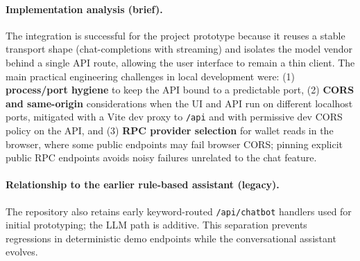 \documentclass[12pt,a4paper]{report}
\begin{document}
\paragraph{Implementation analysis (brief).}
The integration is successful for the project prototype because it reuses a stable transport shape (chat-completions with streaming) and isolates the model vendor behind a single API route, allowing the user interface to remain a thin client. The main practical engineering challenges in local development were: (1) \textbf{process/port hygiene} to keep the API bound to a predictable port, (2) \textbf{CORS and same-origin} considerations when the UI and API run on different localhost ports, mitigated with a Vite dev proxy to \texttt{/api} and with permissive dev CORS policy on the API, and (3) \textbf{RPC provider selection} for wallet reads in the browser, where some public endpoints may fail browser CORS; pinning explicit public RPC endpoints avoids noisy failures unrelated to the chat feature.

\paragraph{Relationship to the earlier rule-based assistant (legacy).}
The repository also retains early keyword-routed \texttt{/api/chatbot} handlers used for initial prototyping; the LLM path is additive. This separation prevents regressions in deterministic demo endpoints while the conversational assistant evolves.
\end{document}
